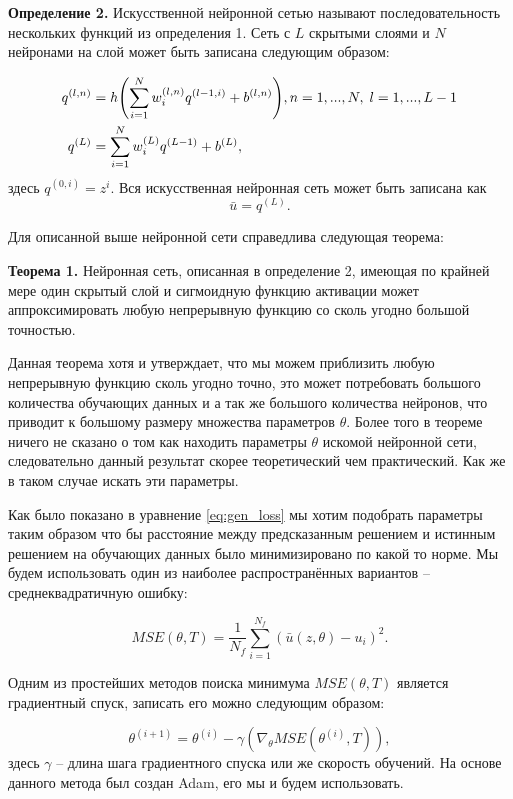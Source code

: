 \documentclass[a4paper,14pt]{extarticle} %
\begin{document}
\textbf{Определение 2.} Искусственной нейронной сетью называют последовательность нескольких функций из определения 1. Сеть с $L$ скрытыми слоями и $N$ нейронами на слой может быть записана следующим образом:

\begin{equation}
    \begin{aligned}
        q^{(l, n)} & = h{\left( \sum_{i=1}^N w_i^{(l,n)}q^{(l-1,i)}+b^{(l,n)} \right)}, n=1,...,N,\; l=1,...,L-1 \\
        q^{(L)}    & ={\sum_{i=1}^N w_i^{(L)}q^{(L-1)}+b^{(L)}},
    \end{aligned}
\end{equation}
здесь $q^{(0, i)}=z^i$. Вся искусственная нейронная сеть может быть записана как
\begin{equation}
    \bar{u} = q^{(L)}.
\end{equation}

Для описанной выше нейронной сети справедлива следующая теорема:

\textbf{Теорема 1.} Нейронная сеть, описанная в определение 2, имеющая по крайней мере один скрытый слой и сигмоидную функцию активации может аппроксимировать любую непрерывную функцию со сколь угодно большой точностью.

Данная теорема хотя и утверждает, что мы можем приблизить любую непрерывную функцию сколь угодно точно, это может потребовать большого количества обучающих данных и а так же большого количества нейронов, что приводит к большому размеру множества параметров $\theta$. Более того в теореме ничего не сказано о том как находить параметры $\theta$ искомой нейронной сети, следовательно данный результат скорее теоретический чем практический. Как же в таком случае искать эти параметры.

Как было показано в уравнение \eqref{eq:gen_loss} мы хотим подобрать параметры таким образом что бы расстояние между предсказанным решением и истинным решением на обучающих данных было минимизировано по какой то норме. Мы будем использовать один из наиболее распространённых вариантов -- среднеквадратичную ошибку:

\begin{equation}
    MSE(\theta, T) = \frac{1}{N_f}\sum_{i=1}^{N_f}(\bar{u}(z, \theta)-u_i)^2.
\end{equation}

Одним из простейших методов поиска минимума $MSE(\theta, T)$ является градиентный спуск, записать его можно следующим образом:

\begin{equation}
    \theta^{(i+1)} = \theta^{(i)} - \gamma(\nabla_\theta MSE(\theta^{(i)}, T)),
\end{equation}
здесь $\gamma$ -- длина шага градиентного спуска или же скорость обучений. На основе данного метода был создан Adam, его мы и будем использовать.
\end{document}
